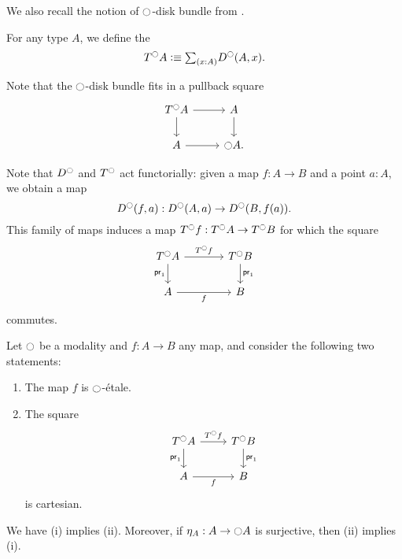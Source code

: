 \documentclass[9pt,twosided]{amsart}
\begin{document}
We also recall the notion of ${\ocircle}$-disk bundle from \cite{wellen-thesis}.

\begin{defn}
  For any type $A$, we define the 
  \begin{equation*}
    T^\modal A \defeq \sm{x:A}D^\modal(A,x).
  \end{equation*}
\end{defn}

Note that the ${\ocircle}$-disk bundle fits in a pullback square
\begin{equation*}
  \begin{tikzcd}
    T^\modal A \arrow[r] \arrow[d] & A \arrow[d] \\
    A \arrow[r] & \modal A.
  \end{tikzcd}
\end{equation*}

Note that $D^{\ocircle}$ and $T^{\ocircle}$ act functorially: given a map $f:A\to B$ and a point $a:A$, we obtain a map
\begin{equation*}
  D^{\ocircle}(f,a) : D^{\ocircle}(A,a)\to D^{\ocircle}(B,f(a)).
\end{equation*}
This family of maps induces a map $T^{\ocircle} f:T^{\ocircle} A \to T^{\ocircle} B$ for which the square
\begin{equation*}
  \begin{tikzcd}[column sep=large]
    T^\modal A \arrow[r,"T^\modal f"] \arrow[d,swap,"\proj 1"] & T^\modal B \arrow[d,"\proj 1"] \\
    A \arrow[r,swap,"f"] & B
  \end{tikzcd}
\end{equation*}
commutes.

\begin{prp}\label{lem:etale_char}
  Let ${\ocircle}$ be a modality and $f:A\to B$ any map, and consider the following two statements:
  \begin{enumerate}
  \item The map $f$ is ${\ocircle}$-\'etale.
  \item The square
    \begin{equation*}
      \begin{tikzcd}
        T^\modal A \arrow[r,"T^\modal f"] \arrow[d,swap,"\proj 1"] & T^\modal B \arrow[d,"\proj 1"] \\
        A \arrow[r,swap,"f"] & B
      \end{tikzcd}
    \end{equation*}
    is cartesian.
  \end{enumerate}
  We have (i) implies (ii). Moreover, if $\eta_A:A\to{\ensuremath{\ocircle}} A$ is surjective, then (ii) implies (i).
\end{prp}
\end{document}
